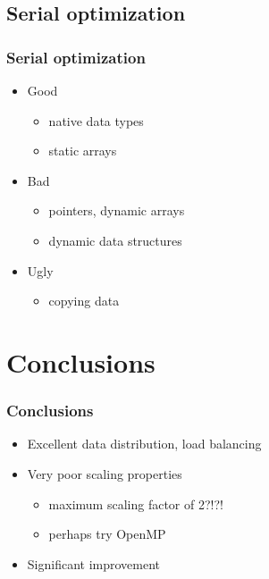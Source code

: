 \documentclass{beamer}
\begin{document}
\subsection{Serial optimization}
\begin{frame}
  \frametitle{Serial optimization}
  \begin{itemize}
    \item<2-> Good
    \begin{itemize}
      \item<2-> native data types
      \item<2-> static arrays
    \end{itemize}
    \item<3-> Bad
    \begin{itemize}
      \item<3-> pointers, dynamic arrays
      \item<3-> dynamic data structures
    \end{itemize}
    \item<4-> Ugly
    \begin{itemize}
      \item<4-> copying data %
    \end{itemize}
  \end{itemize}
\end{frame}

\section{Conclusions}
\begin{frame}
  \frametitle{Conclusions}
  \begin{itemize}
    \item<2-> Excellent data distribution, load balancing
    \item<3-> Very poor scaling properties
    \begin{itemize}
      \item<4-> maximum scaling factor of 2?!?!
      \item<5-> perhaps try OpenMP
    \end{itemize}
    \item<6-> Significant improvement
  \end{itemize}
\end{frame}
\end{document}
